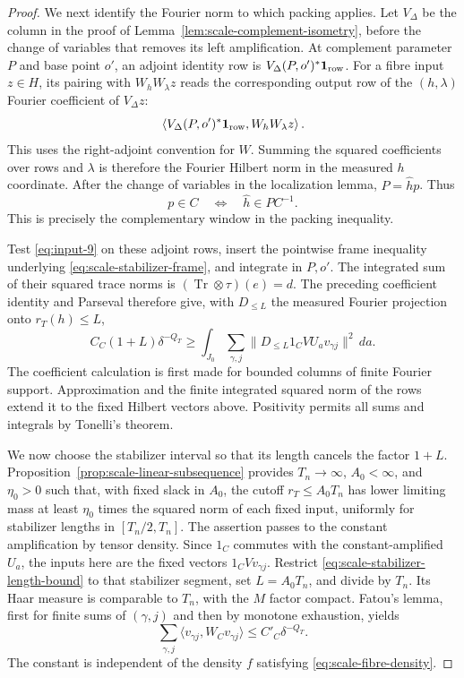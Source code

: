 \begin{proof}
We next identify the Fourier norm to which packing applies. Let
$V_\Delta$ be the column in the proof of
Lemma~\ref{lem:scale-complement-isometry}, before the change of variables
that removes its left amplification. At complement parameter $P$ and
base point $o'$, an adjoint identity row is
$V_\Delta(P,o')^*\mathbf1_{\rm row}$. For a fibre input $z\in H$,
its pairing with $W_hW_\lambda z$ reads the corresponding output row of the
$(h,\lambda)$ Fourier coefficient of $V_\Delta z$:
\[
 \left\langle V_\Delta(P,o')^*\mathbf1_{\rm row},
                 W_hW_\lambda z\right\rangle.
\]
This uses the right-adjoint convention for $W$. Summing the squared
coefficients over rows and $\lambda$ is therefore the Fourier Hilbert
norm in the measured $h$ coordinate. After the change of variables in
the localization lemma, $P=\hat h p$. Thus
\[
 p\in C\quad\Longleftrightarrow\quad \hat h\in PC^{-1}.
\]
This is precisely the complementary window in the packing inequality.

Test \eqref{eq:input-9} on these adjoint rows, insert the pointwise
frame inequality underlying \eqref{eq:scale-stabilizer-frame}, and
integrate in $P,o'$. The integrated
sum of their squared trace norms is
$(\operatorname{Tr}\otimes\tau)(e)=d$. The preceding coefficient identity
and Parseval therefore give, with $D_{\le L}$ the measured Fourier
projection onto $r_T(h)\le L$,
\begin{equation}
 C_C(1+L)\delta^{-Q_T}
 \ge\int_{J_0}\sum_{\gamma,j}
       \|D_{\le L}1_CVU_av_{\gamma j}\|^2\,da.
 \label{eq:scale-stabilizer-length-bound}
\end{equation}
The coefficient calculation is first made for bounded columns of finite
Fourier support. Approximation and the finite integrated squared norm
of the rows extend it to the fixed Hilbert vectors above. Positivity
permits all sums and integrals by Tonelli's theorem.

We now choose the stabilizer interval so that its length cancels the
factor $1+L$. Proposition~\ref{prop:scale-linear-subsequence} provides
$T_n\to\infty$, $A_0<\infty$, and $\eta_0>0$ such that, with fixed
slack in $A_0$, the cutoff $r_T\le A_0T_n$ has lower limiting mass at
least $\eta_0$ times the squared norm of each fixed input, uniformly
for stabilizer lengths in $[T_n/2,T_n]$. The assertion passes to the
constant amplification by tensor density. Since $1_C$ commutes with
the constant-amplified $U_a$, the inputs here are the fixed vectors
$1_CVv_{\gamma j}$. Restrict
\eqref{eq:scale-stabilizer-length-bound} to that stabilizer segment,
set $L=A_0T_n$, and divide by $T_n$. Its Haar measure is comparable to
$T_n$, with the $M$ factor compact. Fatou's lemma, first for finite sums
of $(\gamma,j)$ and then by monotone exhaustion, yields
\begin{equation}
 \sum_{\gamma,j}\langle v_{\gamma j},W_Cv_{\gamma j}\rangle
 \le C'_C\delta^{-Q_T}.
 \label{eq:scale-weighted-frame-bound}
\end{equation}
The constant is independent of the density $f$ satisfying
\eqref{eq:scale-fibre-density}.


\end{proof}
